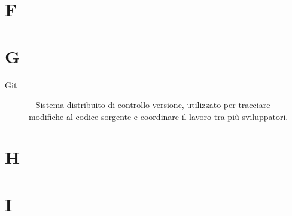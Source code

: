 \section*{F}

\section*{G}
\begin{description}
    \item[Git] -- Sistema distribuito di controllo versione, utilizzato per tracciare modifiche al codice sorgente e coordinare il lavoro tra più sviluppatori.
\end{description}

\section*{H}

\section*{I}

